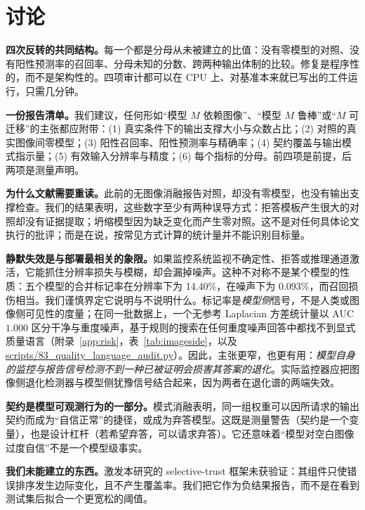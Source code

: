 \section{讨论}
\label{sec:discussion}

\textbf{四次反转的共同结构。}每一个都是分母从未被建立的比值：没有零模型的对照、没有阳性预测率的召回率、分母未知的分数、跨两种输出体制的比较。修复是程序性的，而不是架构性的。四项审计都可以在 CPU 上、对基准本来就已写出的工件运行，只需几分钟。

\textbf{一份报告清单。}我们建议，任何形如``模型 $M$ 依赖图像''、``模型 $M$ 鲁棒''或``$M$ 可迁移''的主张都应附带：(1) 真实条件下的输出支撑大小与众数占比；(2) 对照的真实图像间零模型；(3) 阳性召回率、阳性预测率与精确率；(4) 契约覆盖与输出模式指示量；(5) 有效输入分辨率与精度；(6) 每个指标的分母。前四项是前提，后两项是测量声明。

\textbf{为什么文献需要重读。}此前的无图像消融报告对照，却没有零模型，也没有输出支撑检查。我们的结果表明，这些数字至少有两种误导方式：拒答模板产生很大的对照却没有证据提取；坍缩模型因为缺乏变化而产生零对照。这不是对任何具体论文执行的批评；而是在说，按常见方式计算的统计量并不能识别目标量。

\textbf{静默失效是与部署最相关的象限。}如果监控系统监视不确定性、拒答或推理通道激活，它能抓住分辨率损失与模糊，却会漏掉噪声。这种不对称不是某个模型的性质：五个模型的合并标记率在分辨率下为 14.40\%，在噪声下为 0.093\%，而召回损伤相当。我们谨慎界定它说明与不说明什么。标记率是\emph{模型侧}信号，不是人类或图像侧可见性的度量；在同一批数据上，一个无参考 Laplacian 方差统计量以 AUC $1.000$ 区分干净与重度噪声，基于规则的搜索在任何重度噪声回答中都找不到显式质量语言（附录~\ref{app:risk}，表~\ref{tab:imageside}，以及 \url{scripts/83_quality_language_audit.py}）。因此，主张更窄，也更有用：\emph{模型自身的监控与报告信号检测不到一种已被证明会损害其答案的退化}。实际监控器应把图像侧退化检测器与模型侧犹豫信号结合起来，因为两者在退化谱的两端失效。

\textbf{契约是模型可观测行为的一部分。}模式消融表明，同一组权重可以因所请求的输出契约而成为``自信正常''的捷径，或成为弃答模型。这既是测量警告（契约是一个变量），也是设计杠杆（若希望弃答，可以请求弃答）。它还意味着``模型对空白图像过度自信''不是一个模型级事实。

\textbf{我们未能建立的东西。}激发本研究的 selective-trust 框架未获验证：其组件只使错误排序发生边际变化，且不产生覆盖率。我们把它作为负结果报告，而不是在看到测试集后拟合一个更宽松的阈值。
